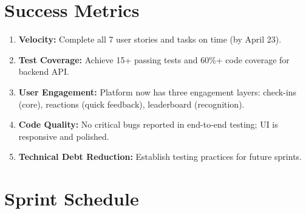 \documentclass[11pt]{article}
\begin{document}
\section{Success Metrics}

\begin{enumerate}[leftmargin=1.5em]
    \item \textbf{Velocity:} Complete all 7 user stories and tasks on time (by April 23).

    \item \textbf{Test Coverage:} Achieve 15+ passing tests and 60\%+ code coverage for backend API.

    \item \textbf{User Engagement:} Platform now has three engagement layers: check-ins (core), reactions (quick feedback), leaderboard (recognition).

    \item \textbf{Code Quality:} No critical bugs reported in end-to-end testing; UI is responsive and polished.

    \item \textbf{Technical Debt Reduction:} Establish testing practices for future sprints.
\end{enumerate}

\section{Sprint Schedule}
\end{document}
